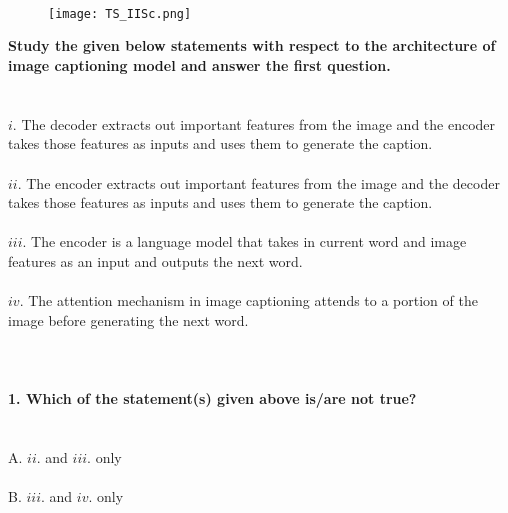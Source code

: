 \documentclass[prl,twocolumn,showpacs,preprintnumbers,superscriptaddress]{revtex4}
\theoremstyle{plain}
\theoremstyle{definition}
\begin{document}
\begin{widetext}
\\
\\
\\

\begin{wrapfigure}
\centering
\end{wrapfigure}
\begin{figure}[h!]
 \begin{right}
  \hfill\texttt{[image: TS\_IISc.png]}
 \end{right}
\end{figure}
\noindent\textbf{Study the given below statements with respect to the architecture of image captioning model and answer the first question.}
\\
\\
\\
$i.$ The decoder extracts out important features from the image and the encoder takes those features as inputs and uses them to generate the caption.
\\
\\
$ii.$ The encoder extracts out important features from the image and the decoder takes those features as inputs and uses them to generate the caption.
\\
\\
$iii.$ The encoder is a language model that takes in current word and image features as an input and outputs the next word.
\\
\\
$iv.$ The attention mechanism in image captioning attends to a portion of the image before generating the next word.
\\
\\
\\
\\
\textbf{1. Which of the statement(s) given above is/are not true?}
\\
\\
\\
A. $ii.$ and $iii.$ only
\\
\\
B. $iii.$ and $iv.$ only
\\

\end{widetext}
\end{document}
